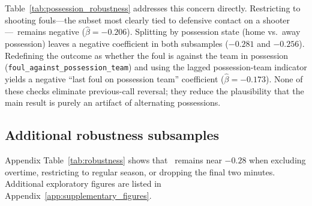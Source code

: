 Table~\ref{tab:possession_robustness} addresses this concern directly. Restricting to shooting fouls---the subset most clearly tied to defensive contact on a shooter---\foullast\ remains negative ($\hat{\beta}=-0.206$). Splitting by possession state (home vs.\ away possession) leaves a negative coefficient in both subsamples ($-0.281$ and $-0.256$). Redefining the outcome as whether the foul is against the team in possession (\texttt{foul\_against\_possession\_team}) and using the lagged possession-team indicator yields a negative ``last foul on possession team'' coefficient ($\hat{\beta}=-0.173$). None of these checks eliminate previous-call reversal; they reduce the plausibility that the main result is purely an artifact of alternating possessions.



\subsection{Additional robustness subsamples}
\label{sec:results:robustness}

Appendix Table~\ref{tab:robustness} shows that \foullast\ remains near $-0.28$ when excluding overtime, restricting to regular season, or dropping the final two minutes. Additional exploratory figures are listed in Appendix~\ref{app:supplementary_figures}.
